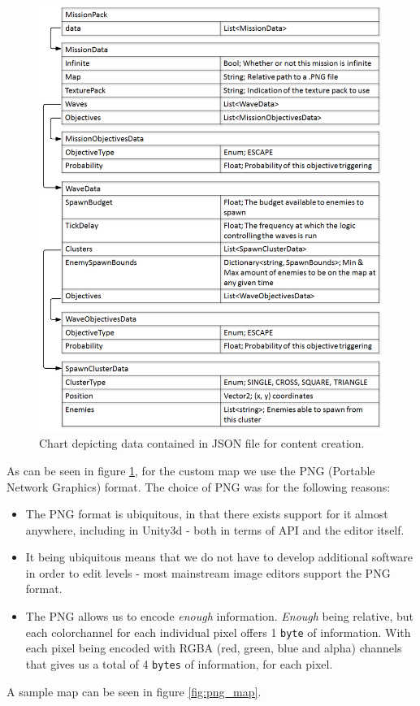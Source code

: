 \begin{figure}[H]
    \centering
    \includegraphics[width=1\textwidth]{figures/missions/chart.png}
    \caption{Chart depicting data contained in JSON file for content creation.}
    \label{fig:json_chart}
\end{figure}

As can be seen in figure \ref{fig:json_chart}, for the custom map we use the PNG (Portable Network Graphics) format.
The choice of PNG was for the following reasons:
\begin{itemize}
    \item The PNG format is ubiquitous, in that there exists support for it almost anywhere, including in Unity3d - both in terms of API and the editor itself.
    \item It being ubiquitous means that we do not have to develop additional software in order to edit levels - most mainstream image editors support the PNG format.
    \item The PNG allows us to encode \textit{enough} information. 
    	\textit{Enough} being relative, but each colorchannel for each individual pixel offers 1 \texttt{byte} of information.
    	With each pixel being encoded with RGBA (red, green, blue and alpha) channels that gives us a total of 4 \texttt{bytes} of information, for each pixel.
\end{itemize}

A sample map can be seen in figure \ref{fig:png_map}.